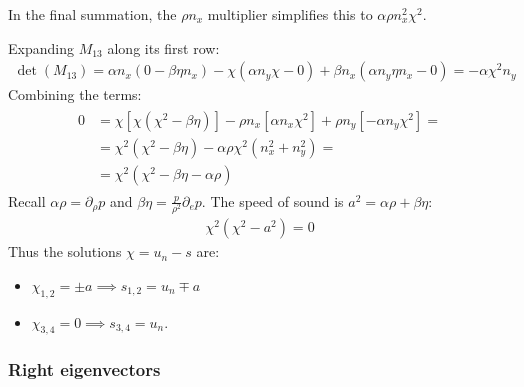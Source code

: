\documentclass[letterpaper,10pt,english]{jupyterBook}
\begin{document}
\sphinxAtStartPar
{} In the final summation, the \(\rho n_x\) multiplier simplifies this to \(\alpha \rho n_x^2 \chi^2\).

\sphinxAtStartPar
{}
Expanding \(M_{13}\) along its first row:
\begin{equation*}
\begin{split}
\det(M_{13}) = \alpha n_x(0 - \beta \eta n_x) - \chi(\alpha n_y \chi - 0) + \beta n_x(\alpha n_y \eta n_x - 0) = - \alpha \chi^2 n_y
\end{split}
\end{equation*}
\sphinxAtStartPar
{}
Combining the terms:
\begin{equation*}
\begin{split}\begin{aligned}
  0
  & = \chi[\chi(\chi^2 - \beta \eta)] - \rho n_x [\alpha n_x \chi^2] + \rho n_y [- \alpha n_y \chi^2] = \\
  & = \chi^2 ( \chi^2 - \beta \eta) - \alpha \rho \chi^2 (n_x^2 + n_y^2) = \\
  & = \chi^2 ( \chi^2 - \beta \eta - \alpha \rho )
\end{aligned}\end{split}
\end{equation*}
\sphinxAtStartPar
{}
Recall \(\alpha \rho = \partial_{\rho}p\) and \(\beta \eta = \frac{p}{\rho^2}\partial_{e}p\). The speed of sound is \(a^2 = \alpha \rho + \beta \eta\):
\begin{equation*}
\begin{split}
\chi^2 ( \chi^2 - a^2 ) = 0
\end{split}
\end{equation*}
\sphinxAtStartPar
Thus the solutions \(\chi = u_n - s\) are:
\begin{itemize}
\item {} 
\sphinxAtStartPar
\(\chi_{1,2} = \pm a \implies s_{1,2} = u_n \mp a\)

\item {} 
\sphinxAtStartPar
\(\chi_{3,4} = 0 \implies s_{3,4} = u_n\).

\end{itemize}
\subsubsection*{Right eigenvectors}
\end{document}
